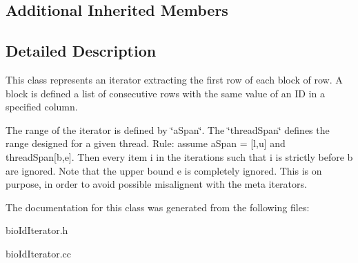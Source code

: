 \subsection*{Additional Inherited Members}


\subsection{Detailed Description}
This class represents an iterator extracting the first row of each block of row. A block is defined a list of consecutive rows with the same value of an ID in a specified column.

The range of the iterator is defined by \char`\"{}a\+Span\char`\"{}. The \char`\"{}thread\+Span\char`\"{} defines the range designed for a given thread. Rule\+: assume a\+Span = \mbox{[}l,u\mbox{]} and thread\+Span\mbox{[}b,e\mbox{]}. Then every item i in the iterations such that i is strictly before b are ignored. Note that the upper bound e is completely ignored. This is on purpose, in order to avoid possible misalignent with the meta iterators. 

The documentation for this class was generated from the following files\+:\begin{DoxyCompactItemize}
\item 
bio\+Id\+Iterator.\+h\item 
bio\+Id\+Iterator.\+cc\end{DoxyCompactItemize}
